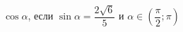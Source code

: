 \begin{ex}[type=simplify_calculate]
	\begin{condition}
		\( \cos\alpha \), \quad если \( \sin\alpha=\dfrac{2\sqrt{6}}{5} \) и \( \alpha\in\left( \dfrac{\pi}{2};\pi \right) \)
	\end{condition}
\end{ex}